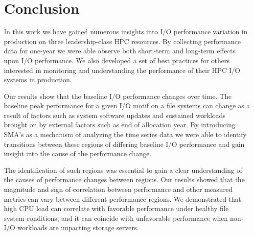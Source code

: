 \section{Conclusion} \label{sec:conclusions}

% 
% 
%
% 
%
%
%
% 
% 

In this work we have gained numerous insights into I/O performance variation
in production on three leadership-class HPC resources. By collecting
performance data for one-year we were able observe both short-term and
long-term effects upon I/O performance. We also developed a set of best
practices for others interested in monitoring and understanding the performance of their HPC I/O systems in production.

Our results show that the baseline I/O performance changes over time. The
baseline peak performance for a given I/O motif on a file systems can change
as a result of factors such as system software updates and sustained
workloads brought on by external factors such as end of allocation year. By introducing SMA's as a mechanism of analyzing the time series data we were able to identify transitions between these regions of differing baseline I/O performance and gain insight into the cause of the performance change. 

The identification of such regions was essential to gain a clear understanding of the causes of performance changes between regions. Our results showed that the magnitude and sign of correlation between performance and other measured metrics can vary between different performance regions.
We demonstrated that high CPU load can correlate with favorable performance under healthy file system conditions, and it can coincide with unfavorable performance when non-I/O workloads are impacting storage servers.

